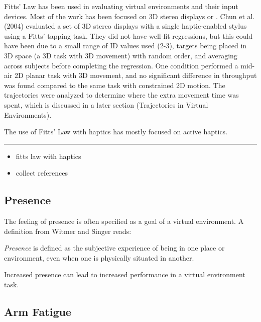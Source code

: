 Fitts' Law has been used in evaluating virtual environments and their input devices.
Most of the work has been focused on 3D stereo displays\cite{liu_comparing_2009} or .
Chun et al. (2004) evaluated a set of 3D stereo displays with a single haptic-enabled stylus using a Fitts’ tapping task.
They did not have well-fit regressions, but this could have been due to a small range of ID values used (2-3), targets being placed in 3D space (a 3D task with 3D movement) with random order, and averaging across subjects before completing the regression.
One condition performed a mid-air 2D planar task with 3D movement, and no significant difference in throughput was found compared to the same task with constrained 2D motion.
The trajectories were analyzed to determine where the extra movement time was spent, which is discussed in a later section (Trajectories in Virtual Environments).

The use of Fitts' Law with haptics has mostly focused on active haptics\cite{chun_evaluating_2004}.
\rule{0.75\textwidth}{1pt}
\begin{itemize}
  \item fitts law with haptics
  \item collect references
\end{itemize}

\subsection{Presence}

The feeling of presence is often specified as a goal of a virtual environment.
A definition from Witmer and Singer\cite{witmer_measuring_1994} reads:
\begin{displayquote}
\textit{Presence} is defined as the subjective experience of being in one place or environment, even when one is physically situated in another.
\end{displayquote}
Increased presence can lead to increased performance in a virtual environment task\cite{youngblut_relationship_2003}.

\subsection{Arm Fatigue}

